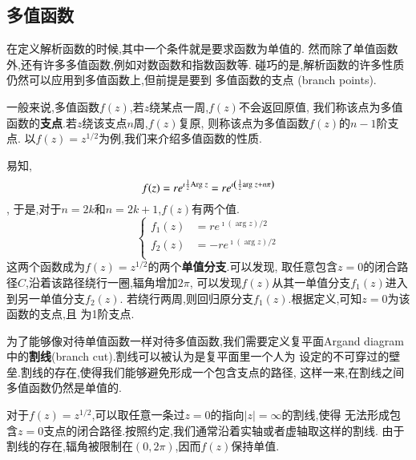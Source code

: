 \subsection{多值函数}
在定义解析函数的时候,其中一个条件就是要求函数为单值的.
然而除了单值函数外,还有许多多值函数,例如对数函数和指数函数等.
碰巧的是,解析函数的许多性质仍然可以应用到多值函数上,但前提是要到
多值函数的支点 (branch points).

一般来说,多值函数$f(z)$,若$z$绕某点一周,$f(z)$不会返回原值,
我们称该点为多值函数的\textbf{支点}.若$z$绕该支点$n$周,$f(z)$复原,
则称该点为多值函数$f(z)$的$n-1$阶支点.
以$f(z) = z^{1/2}$为例,我们来介绍多值函数的性质.

易知,\[
    f(z) = r e^{\imath {\frac{1}{2}}  {\mathrm{Arg}\;} z}
    =  r e^{\imath \left( {\frac{1}{2}} {\mathrm{arg}\;} z + n \pi \right)}
    \],
于是,对于$n= 2k$和$n=2k+1$,$f(z)$有两个值.
\begin{equation}
    \left\{\begin{aligned}
    f_1(z) & =r e^{\imath(\arg z) / 2} \\
    f_2(z) & =-r e^{\imath(\arg z) / 2} \\
    \end{aligned}\right.
\end{equation}
这两个函数成为$f(z)= z^{1/2}$的两个\textbf{单值分支}.可以发现,
取任意包含$z=0$的闭合路径$C$,沿着该路径绕行一圈,辐角增加$2\pi$,
可以发现$f(z)$从其一单值分支$f_1(z)$进入到另一单值分支$f_2(z)$.
若绕行两周,则回归原分支$f_1(z)$.根据定义,可知$z=0$为该函数的支点,且
为1阶支点.

为了能够像对待单值函数一样对待多值函数,我们需要定义复平面Argand diagram
中的\textbf{割线}(branch cut).割线可以被认为是复平面里一个人为
设定的不可穿过的壁垒.割线的存在,使得我们能够避免形成一个包含支点的路径,
这样一来,在割线之间多值函数仍然是单值的.

对于$f(z)=z^{1/2}$,可以取任意一条过$z=0$的指向$|z|=\infty$的割线,使得
无法形成包含$z=0$支点的闭合路径.按照约定,我们通常沿着实轴或者虚轴取这样的割线.
由于割线的存在,辐角被限制在$(0,2\pi)$,因而$f(z)$保持单值.

